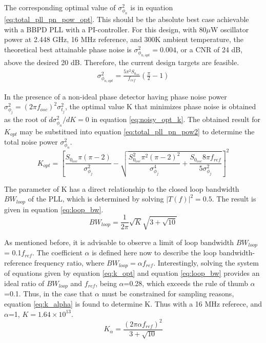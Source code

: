 			The corresponding optimal value of $\sigma^2_{\phi_n} $ is in equation \ref{eq:total_pll_pn_pow_opt}. This should be the absolute best case achievable with a BBPD PLL with a PI-controller. For this design, with 80$\mu$W oscillator power at 2.448 GHz, 16 MHz reference, and 300K ambient temperature, the theoretical best attainable phase noise is $\sigma^2_{\phi_{n,opt}}=0.004$, or a CNR of 24 dB, above the desired 20 dB. Therefore, the current design targets are feasible. 
			\begin{align} \label{eq:total_pll_pn_pow_opt} 
				\sigma^2_{\phi_{n,opt}}  =
				\frac{5\pi^2S_{0_{osc}}}{f_{ref}}\left(\frac{\pi}{2}-1\right) 
			\end{align}	 

			In the presence of a non-ideal phase detector having phase noise power $\sigma^2_{\phi_j} = (2\pi f_{osc})^2\sigma^2_{t_j}$, the optimal value K that minimizes phase noise is obtained as the root of $d\sigma^2_{\phi_n}/dK = 0$ in equation \ref{eq:noisy_opt_k}. The obtained result for $K_{opt}$ may be substitued into equation \ref{eq:total_pll_pn_pow2} to determine the total noise power $\sigma^2_{\phi_n}$. 
			\begin{equation}\label{eq:noisy_opt_k}
				K_{opt} = \left[\frac{S_{0_{osc}}\pi(\pi-2)}{\sigma^2_{\phi_j}} -
				\sqrt{\frac{S_{0_{osc}}^2\pi^2(\pi-2)^2}{\sigma^4_{\phi_j}} +
				\frac{S_{0_{osc}}8\pi f_{ref}}{5\sigma^2_{\phi_j}}} \right]^2 
			\end{equation}

			The parameter of K has a direct relationship to the closed loop bandwidth $BW_{loop}$ of the PLL, which is determined by solving $|T(f)|^2 = 0.5$. The result is given in equation \ref{eq:loop_bw}. 
			\begin{equation}\label{eq:loop_bw} 
				BW_{loop} = \frac{1}{2\pi}\sqrt{K}\sqrt{3+
				\sqrt{10}} 
			\end{equation} 

			As mentioned before, it is advisable to observe a limit of loop bandwidth $BW_{loop}$ = 0.1$f_{ref}$. The coefficient $\alpha$ is defined here now to describe the loop bandwidth-reference frequency ratio, where $BW_{loop} = \alpha f_{ref}$. Interestingly, solving the system of equations given by equation \ref{eq:k_opt} and equation \ref{eq:loop_bw} provides an ideal ratio of $BW_{loop}$ and $f_{ref}$, being $\alpha$=0.28, which exceeds the rule of thumb $\alpha$=0.1. Thus, in the case that $\alpha$ must be constrained for sampling reasons, equation \ref{eq:k_alpha} is found to determine K. Thus with a 16 MHz referece, and $\alpha$=1, $K=1.64\times10^{13}$. 
			\begin{equation}\label{eq:k_alpha} 
				K_\alpha = \frac{(2\pi\alpha f_{ref})^2}{3
				+ \sqrt{10}} 
			\end{equation}

